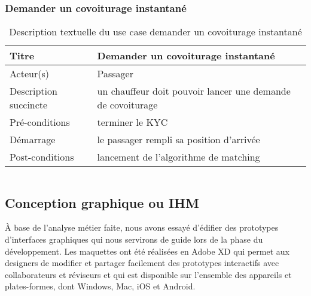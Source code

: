 \subsubsection{Demander un covoiturage instantané} %
\begin{table}[H]
\begin{center}
    \begin{tabular}{ | l | p{10cm} | }
    \hline
    Titre & Demander un covoiturage instantané \\ \hline
    Acteur(s) & Passager \\ \hline
    Description succincte & un chauffeur doit pouvoir lancer une demande de covoiturage \\ \hline
    Pré-conditions & terminer le KYC \\ \hline
    Démarrage & le passager rempli sa position d'arrivée \\ \hline
    Post-conditions & lancement de l'algorithme de matching \\ \hline
    \end{tabular}
    \caption{Description textuelle du use case demander un covoiturage instantané}
\end{center}
\end{table}

\begin{tabular}{c}

\end{tabular}

\subsection{Conception graphique ou IHM} %
\label{sub:ihm}
À base de l'analyse métier faite, nous avons essayé d’édifier des prototypes d'interfaces graphiques qui nous servirons de guide lors de la phase du développement.\newline
Les maquettes ont été réalisées en Adobe XD qui permet aux designers de modifier et partager facilement des prototypes interactifs avec collaborateurs et réviseurs et qui est disponible sur l'ensemble des appareils et plates-formes, dont Windows, Mac, iOS et Android.

